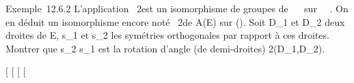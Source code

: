 \documentclass[]{article}
\begin{document}
Exemple~12.6.2 L'application \theta\mapsto~2\theta est un
isomorphisme de groupes de ~\diagup\pi~ sur ~\pi~. On en déduit un isomorphisme
encore noté \theta\mapsto~2\theta de A(E) sur
\tildeA(). Soit D_1 et D_2 deux
droites de E, s_1 et s_2 les symétries orthogonales
par rapport à ces droites. Montrer que s_2 \cdot s_1 est
la rotation d'angle (de demi-droites)
2\widehat(D_1,D_2).

[
[
[
[
\end{document}
